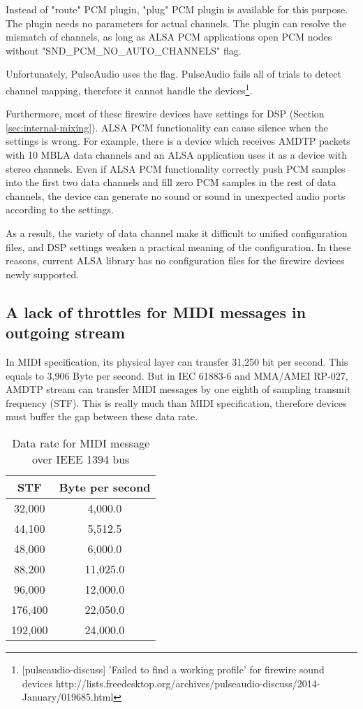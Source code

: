 \documentclass[onecolumn]{article}
\begin{document}
Instead of "route" PCM plugin, "plug" PCM plugin is available for this purpose. The plugin needs no parameters for actual channels. The plugin can resolve the mismatch of channels, as long as ALSA PCM applications open PCM nodes without "SND\_PCM\_NO\_AUTO\_CHANNELS" flag.

Unfortunately, PulseAudio uses the flag. PulseAudio fails all of trials to detect channel mapping, therefore it cannot handle the devices\footnote{[pulseaudio-discuss] 'Failed to find a working profile' for firewire sound devices http://lists.freedesktop.org/archives/pulseaudio-discuss/2014-January/019685.html}.

Furthermore, most of these firewire devices have settings for DSP (Section \ref{sec:internal-mixing}). ALSA PCM functionality can cause silence when the settings is wrong. For example, there is a device which receives AMDTP packets with 10 MBLA data channels and an ALSA application uses it as a device with stereo channels. Even if ALSA PCM functionality correctly push PCM samples into the first two data channels and fill zero PCM samples in the rest of data channels, the device can generate no sound or sound in unexpected audio ports according to the settings.

As a result, the variety of data channel make it difficult to unified configuration files, and DSP settings weaken a practical meaning of the configuration. In these reasons, current ALSA library has no configuration files for the firewire devices newly supported.

\subsection{A lack of throttles for MIDI messages in outgoing stream}
In MIDI specification, its physical layer can transfer 31,250 bit per second. This equals to 3,906 Byte per second. But in IEC 61883-6\cite{iec61883-6-1, iec61883-6-2} and MMA/AMEI RP-027\cite{amei-rp27}, AMDTP stream can transfer MIDI messages by one eighth of sampling transmit frequency (STF). This is really much than MIDI specification, therefore devices must buffer the gap between these data rate.

\begin{table}[H]
	\centering
	\caption{{Data rate for MIDI message over IEEE 1394 bus}}
	\label{tbl:midi-rate}
	\begin{tabular}{cc} \toprule
		STF	& Byte per second \\ \midrule
		32,000	& 4,000.0	\\
		44,100	& 5,512.5	\\
		48,000	& 6,000.0	\\
		88,200	& 11,025.0	\\
		96,000	& 12,000.0	\\
		176,400	& 22,050.0	\\
		192,000	& 24,000.0	\\ \bottomrule
	\end{tabular}
\end{table}
\end{document}
